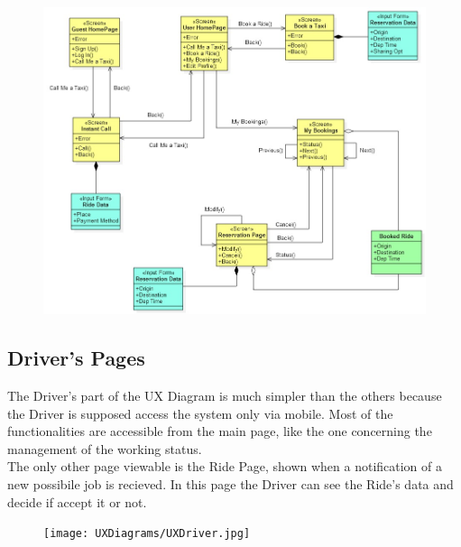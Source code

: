 \begin{figure}[h!]
\centering
		\includegraphics[width=1\textwidth]{UXDiagrams/UXBooking.jpg}
	\end{figure}

\newpage
\subsection{Driver's Pages}
The Driver's part of the UX Diagram is much simpler than the others because the Driver is supposed access the system only via mobile. Most of the functionalities are accessible from the main page, like the one concerning the management of the working status. \\
The only other page viewable is the Ride Page, shown when a notification of a new possibile job is recieved. In this page the Driver can see the Ride's data and decide if accept it or not.
\\
\begin{figure}[h!]
		\centering
		\texttt{[image: UXDiagrams/UXDriver.jpg]}
	\end{figure}